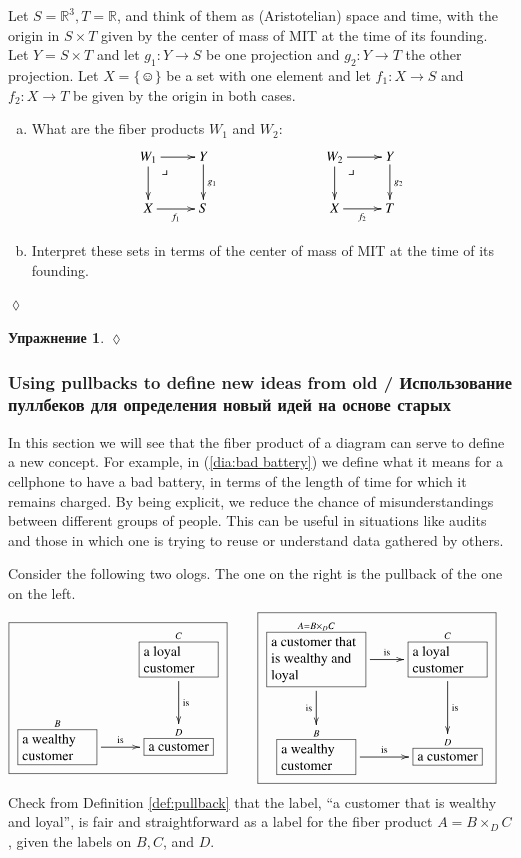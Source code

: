 \documentclass[a4paper]{book}
\makeatletter
\def\tn{\textnormal}
\def\RR{{\mathbb R}}
\def\hsp{\hspace{.3in}}
\def\singleton{\{\smiley\}}
\def\to{\rightarrow}
\def\taking{\colon}
\def\rr{\raggedright}
\newcommand{\LA}[2]{\ar[#1]^-{\tn {#2}}}
\newcommand{\LAL}[2]{\ar[#1]_-{\tn {#2}}}
\newcommand{\obox}[3]{\stackrel{#1}{\fbox{\parbox{#2}{#3}}}}
\newcommand{\smbox}[2]{\stackrel{#1}{\fbox{#2}}}
\def\ullimit{\ar@{}[rd]|(.3)*+{\lrcorner}}
\theoremstyle{myth}
\newtheorem{exampleENG}[envENG]{\begin{english}Example\end{english}}
\newtheorem{excENG}[envENG]{\begin{english}Exercise\end{english}}
\newenvironment{exerciseENG}{\begin{excENG}}{\hspace*{\fill}$\lozenge$\end{excENG}}
\newtheorem{excRUS}[envRUS]{Упражнение}
\newenvironment{exerciseRUS}{\begin{excRUS}}{\hspace*{\fill}$\lozenge$\end{excRUS}}
\def\sexc{\begin{enumerate}[a.)]\setlength{\itemsep}{.1cm}\setlength{\parskip}{.1cm}\item}
\def\next{\item}
\def\endsexc{\end{enumerate}}
\makeatother
\begin{document}
\begin{russian}
\begin{exerciseENG}
Let $S=\RR^3, T=\RR$, and think of them as (Aristotelian) space and time, with the origin in $S\times T$ given by the center of mass of MIT at the time of its founding. Let $Y=S\times T$ and let $g_1\taking Y\to S$ be one projection and $g_2\taking Y\to T$ the other projection. Let $X=\singleton$ be a set with one element and let $f_1\taking X\to S$ and $f_2\taking X\to T$ be given by the origin in both cases. 
\sexc What are the fiber products $W_1$ and $W_2$:
$$
\xymatrix{W_1\ar[r]\ar[d]\ullimit&Y\ar[d]^{g_1}\\X\ar[r]_{f_1}&S}\hspace{1in}
\xymatrix{W_2\ar[r]\ar[d]\ullimit&Y\ar[d]^{g_2}\\X\ar[r]_{f_2}&T}
$$
\next Interpret these sets in terms of the center of mass of MIT at the time of its founding.
\endsexc
\end{exerciseENG}

\begin{exerciseRUS}
 
\end{exerciseRUS}


\subsubsection{Using pullbacks to define new ideas from old / Использование пуллбеков для определения новый идей на основе старых}

In this section we will see that the fiber product of a diagram can serve to define a new concept. For example, in (\ref{dia:bad battery}) we define what it means for a cellphone to have a bad battery, in terms of the length of time for which it remains charged. By being explicit, we reduce the chance of misunderstandings between different groups of people. This can be useful in situations like audits and those in which one is trying to reuse or understand data gathered by others.

 

\begin{exampleENG}
Consider the following two ologs. The one on the right is the pullback of the one on the left. 
\begin{align}\label{dia:wealthy and loyal}
\fbox{\xymatrixnocompile{&\obox{C}{.7in}{\rr a loyal customer}\LA{d}{is}\\\obox{B}{.7in}{\rr a wealthy customer}\LA{r}{is}&\smbox{D}{a customer}}}\hsp&\fbox{\xymatrix{\obox{A=B\times_DC}{.9in}{\rr a customer that is wealthy and loyal}\LAL{d}{is}\LA{r}{is}&\obox{C}{.7in}{\rr a loyal customer}\LA{d}{is}\\\obox{B}{.7in}{\rr a wealthy customer}\LA{r}{is}&\smbox{D}{a customer}}}
\end{align}
Check from Definition \ref{def:pullback} that the label, “a customer that is wealthy and loyal”, is fair and straightforward as a label for the fiber product $A=B\times_DC$, given the labels on $B,C$, and $D$.
\end{exampleENG}


\end{russian}
\end{document}
